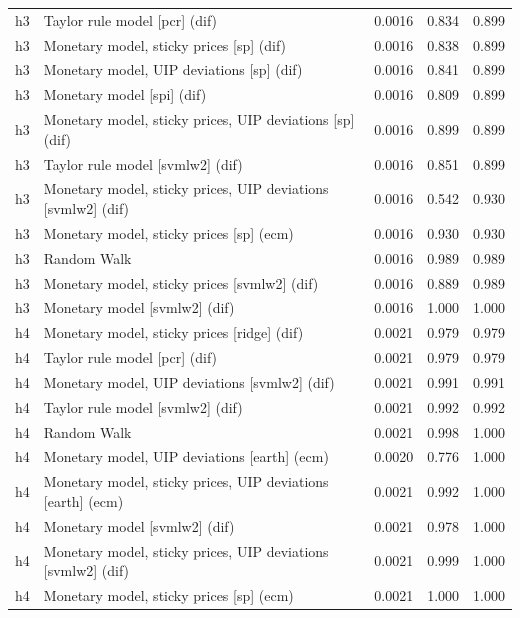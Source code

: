 \begin{ThreePartTable}
\begin{longtable}[t]{cp{5.5cm}ccc}
\addlinespace
h3 & \raggedright Taylor rule model [pcr] (dif) & 0.0016 & 0.834 & 0.899\\
h3 & \raggedright Monetary model, sticky prices [sp] (dif) & 0.0016 & 0.838 & 0.899\\
h3 & \raggedright Monetary model, UIP deviations [sp] (dif) & 0.0016 & 0.841 & 0.899\\
h3 & \raggedright Monetary model [spi] (dif) & 0.0016 & 0.809 & 0.899\\
h3 & \raggedright Monetary model, sticky prices, UIP deviations [sp] (dif) & 0.0016 & 0.899 & 0.899\\
h3 & \raggedright Taylor rule model [svmlw2] (dif) & 0.0016 & 0.851 & 0.899\\
h3 & \raggedright Monetary model, sticky prices, UIP deviations [svmlw2] (dif) & 0.0016 & 0.542 & 0.930\\
h3 & \raggedright Monetary model, sticky prices [sp] (ecm) & 0.0016 & 0.930 & 0.930\\
h3 & \raggedright Random Walk & 0.0016 & 0.989 & 0.989\\
h3 & \raggedright Monetary model, sticky prices [svmlw2] (dif) & 0.0016 & 0.889 & 0.989\\
h3 & \raggedright Monetary model [svmlw2] (dif) & 0.0016 & 1.000 & 1.000\\
\addlinespace
h4 & \raggedright Monetary model, sticky prices [ridge] (dif) & 0.0021 & 0.979 & 0.979\\
h4 & \raggedright Taylor rule model [pcr] (dif) & 0.0021 & 0.979 & 0.979\\
h4 & \raggedright Monetary model, UIP deviations [svmlw2] (dif) & 0.0021 & 0.991 & 0.991\\
h4 & \raggedright Taylor rule model [svmlw2] (dif) & 0.0021 & 0.992 & 0.992\\
h4 & \raggedright Random Walk & 0.0021 & 0.998 & 1.000\\
h4 & \raggedright Monetary model, UIP deviations [earth] (ecm) & 0.0020 & 0.776 & 1.000\\
h4 & \raggedright Monetary model, sticky prices, UIP deviations [earth] (ecm) & 0.0021 & 0.992 & 1.000\\
h4 & \raggedright Monetary model [svmlw2] (dif) & 0.0021 & 0.978 & 1.000\\
h4 & \raggedright Monetary model, sticky prices, UIP deviations [svmlw2] (dif) & 0.0021 & 0.999 & 1.000\\
h4 & \raggedright Monetary model, sticky prices [sp] (ecm) & 0.0021 & 1.000 & 1.000\\

\end{longtable}
\end{ThreePartTable}
